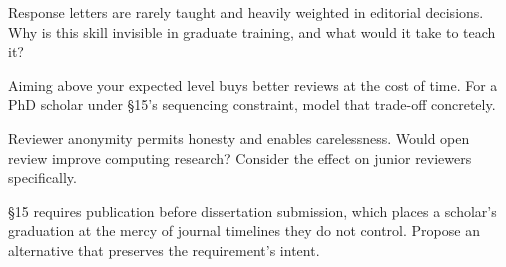 \begin{reviewq}
  \item Response letters are rarely taught and heavily weighted in editorial
    decisions. Why is this skill invisible in graduate training, and what would
    it take to teach it?
  \item Aiming above your expected level buys better reviews at the cost of
    time. For a PhD scholar under \S15's sequencing constraint, model that
    trade-off concretely.
  \item Reviewer anonymity permits honesty and enables carelessness. Would open
    review improve computing research? Consider the effect on junior reviewers
    specifically.
  \item \S15 requires publication before dissertation submission, which places
    a scholar's graduation at the mercy of journal timelines they do not
    control. Propose an alternative that preserves the requirement's intent.
\end{reviewq}
